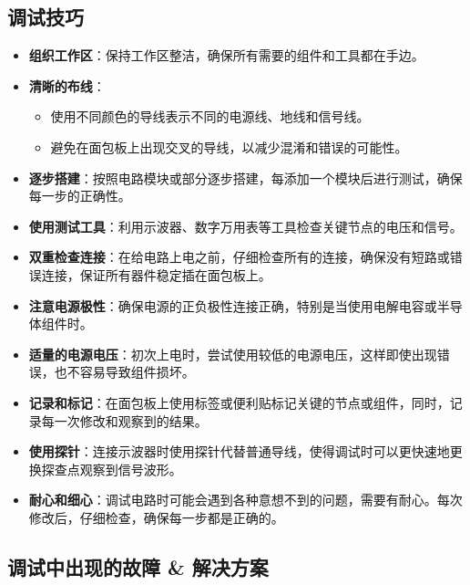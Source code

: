 \documentclass[UTF8,titlepage,a4paper]{ctexart}
\numberwithin{figure}{section}
\begin{document}
\subsection{调试技巧}
\begin{itemize}
    \item \textbf{组织工作区}：保持工作区整洁，确保所有需要的组件和工具都在手边。
    
    \item \textbf{清晰的布线}：
    \begin{itemize}
        \item 使用不同颜色的导线表示不同的电源线、地线和信号线。
        \item 避免在面包板上出现交叉的导线，以减少混淆和错误的可能性。
    \end{itemize}
    
    \item \textbf{逐步搭建}：按照电路模块或部分逐步搭建，每添加一个模块后进行测试，确保每一步的正确性。
    
    \item \textbf{使用测试工具}：利用示波器、数字万用表等工具检查关键节点的电压和信号。
    
    \item \textbf{双重检查连接}：在给电路上电之前，仔细检查所有的连接，确保没有短路或错误连接，保证所有器件稳定插在面包板上。
    
    \item \textbf{注意电源极性}：确保电源的正负极性连接正确，特别是当使用电解电容或半导体组件时。
    
    \item \textbf{适量的电源电压}：初次上电时，尝试使用较低的电源电压，这样即使出现错误，也不容易导致组件损坏。
    
    \item \textbf{记录和标记}：在面包板上使用标签或便利贴标记关键的节点或组件，同时，记录每一次修改和观察到的结果。
    
    \item \textbf{使用探针}：连接示波器时使用探针代替普通导线，使得调试时可以更快速地更换探查点观察到信号波形。

    \item \textbf{耐心和细心}：调试电路时可能会遇到各种意想不到的问题，需要有耐心。每次修改后，仔细检查，确保每一步都是正确的。
    
    
\end{itemize}

\subsection{调试中出现的故障 \& 解决方案}
\end{document}
